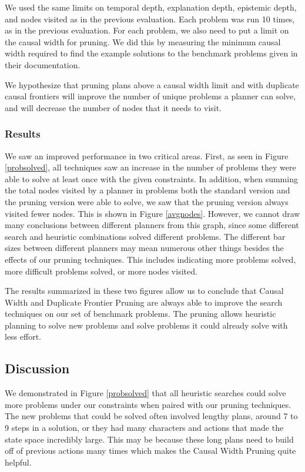 \documentclass[letterpaper]{article} %
\begin{document}
We used the same limits on temporal depth, explanation depth, epistemic depth, and nodes visited as in the previous evaluation. Each problem was run 10 times, as in the previous evaluation. For each problem, we also need to put a limit on the causal width for pruning. We did this by measuring the minimum causal width required to find the example solutions to the benchmark problems given in their documentation.

We hypothesize that pruning plans above a causal width limit and with duplicate causal frontiers will improve the number of unique problems a planner can solve, and will decrease the number of nodes that it needs to visit.

\subsubsection{Results}

We saw an improved performance in two critical areas. First, as seen in Figure \ref{probsolved}, all techniques saw an increase in the number of problems they were able to solve at least once with the given constraints. In addition, when summing the total nodes visited by a planner in problems both the standard version and the pruning version were able to solve, we saw that the pruning version always visited fewer nodes. This is shown in Figure \ref{avgnodes}. However, we cannot draw many conclusions between different planners from this graph, since some different search and heuristic combinations solved different problems. The different bar sizes between different planners may mean numerous other things besides the effects of our pruning techniques. This includes indicating more problems solved, more difficult problems solved, or more nodes visited.

The results summarized in these two figures allow us to conclude that Causal Width and Duplicate Frontier Pruning are always able to improve the search techniques on our set of benchmark problems. The pruning allows heuristic planning to solve new problems and solve problems it could already solve with less effort.

\subsection{Discussion}

We demonstrated in Figure \ref{probsolved} that all heuristic searches could solve more problems under our constraints when paired with our pruning techniques. The new problems that could be solved often involved lengthy plans, around 7 to 9 steps in a solution, or they had many characters and actions that made the state space incredibly large. This may be because these long plans need to build off of previous actions many times which makes the Causal Width Pruning quite helpful.
\end{document}
